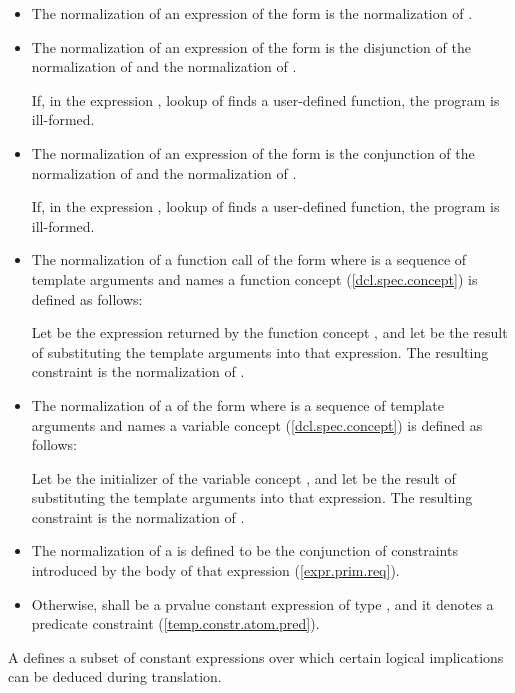 \begin{itemize}
\item The normalization of an expression of the form  is
the normalization of .

\item The normalization of an expression of the form  is
the disjunction of the normalization of  and the
normalization of . 

If, in the expression , lookup of  
finds a user-defined function, the program is ill-formed.

\item The normalization of an expression of the form  is
the conjunction of the normalization of  and the
normalization of . 

If, in the expression , lookup of
 finds a user-defined function, the 
program is ill-formed.

\item The normalization of a function call of the form
where 
is a sequence of template arguments and  names a function
concept (\ref{dcl.spec.concept}) is defined as follows:

Let  be the expression returned by the function concept 
, and let  be the result of substituting the
template arguments into that expression. The resulting constraint is
the normalization of .

\item The normalization of a 
of the form 
where 
is a sequence of template arguments and  names a variable
concept (\ref{dcl.spec.concept}) is defined as follows:

Let  be the initializer of the variable concept
, and let  be the result of substituting the
template arguments into that expression. The resulting constraint is
the normalization of .

\item The normalization of a 
 is 
defined to be the conjunction of constraints introduced by
the body of that expression (\ref{expr.prim.req}).

\item Otherwise,  shall be a prvalue constant
expression of type , and it denotes a
predicate constraint (\ref{temp.constr.atom.pred}).
\end{itemize}
% 
\enternote
A  
defines a subset of constant expressions over which certain 
logical implications can be deduced during translation.

